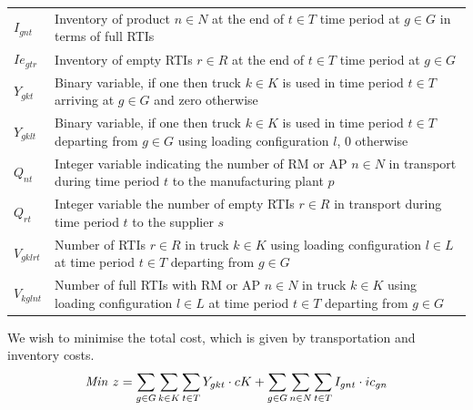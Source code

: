 \begin{longtable}[hbt!]{  |p{}|p{}  |}
  $I_{gnt}$          & Inventory of product $n\in N$ at the end of $t\in T$ time period at $g\in G$ in terms of full RTIs                                                \\
  $Ie_{gtr}$         & Inventory of empty RTIs $r\in R$ at the end of $t\in T$ time period at $g\in G$                                                                   \\
  $Y_{gkt}$          & Binary variable, if one then  truck $k \in K$ is used in time period $t\in T$ arriving at $g\in G$ and zero otherwise                             \\
  $Y_{gklt}$         & Binary variable, if one then truck $k \in K$ is used in time period $t\in T$ departing from $g\in G$ using loading configuration $l$, 0 otherwise \\
  $Q_{nt}$           & Integer variable indicating the number of RM or AP $n\in N$ in transport during time period $t$ to the manufacturing plant $p$                    \\
  $Q_{rt}$           & Integer variable the number of empty RTIs $r\in R$ in transport during time period $t$ to the supplier $s$                                        \\
  $V_{gklrt}$        & Number of RTIs $r\in R$ in truck $k\in K$ using loading configuration $l\in L$ at time period $t\in T$ departing from $g\in G$                    \\
  $V_{kglnt}$        & Number of full RTIs with RM or AP $n\in N$ in truck $k\in K$ using loading configuration $l\in L$ at time period $t\in T$ departing from $g\in G$ \\
  \hline
\end{longtable}


{
We wish to minimise the total cost, which is given by  transportation and inventory costs.}
\begin{equation}
  \text{\textit{Min} } z= \sum_{g \in G}{\sum_{k \in K}{\sum_{t \in T}{Y_{gkt}\cdot cK}}}+ \sum_{g \in G}{\sum_{n \in N}{\sum_{t \in T}{I_{gnt}\cdot ic_{gn}}}}
\end{equation}


